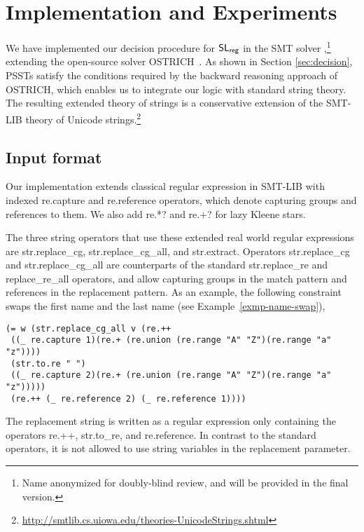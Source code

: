 
\section{Implementation and Experiments}
\label{sect:impl}

We have implemented our decision procedure for $\mathsf{SL}_{\sf reg}$ in the SMT
solver \ostrich,\footnote{Name anonymized for doubly-blind review,
and will be provided in the final version.} extending the
open-source solver OSTRICH~\cite{CHL+19}.
As shown in Section \ref{sec:decision},
PSSTs satisfy the conditions required by the backward reasoning
approach of OSTRICH, which enables us to integrate our logic with
standard string theory. The resulting extended theory of strings is a
conservative extension of the SMT-LIB theory of Unicode
strings.\footnote{\url{http://smtlib.cs.uiowa.edu/theories-UnicodeStrings.shtml}}

\subsection{Input format}

Our implementation extends classical regular expression in SMT-LIB
with indexed {\sf re.capture} and {\sf re.reference} operators, which
denote capturing groups and references to them. We also add {\sf re.*?}
and {\sf re.+?} for lazy Kleene stars.

The three string operators that use these extended real world regular
expressions are {\sf str.replace\_cg}, {\sf str.replace\_cg\_all}, and
{\sf str.extract}. Operators {\sf str.replace\_cg} and {\sf
  str.replace\_cg\_all} are counterparts of the standard {\sf
  str.replace\_re} and {\sf replace\_re\_all} operators, and allow
capturing groups in the match pattern and references in the
replacement pattern. As an example, the following constraint swaps the first name and the last name (see Example~\ref{exmp-name-swap}),
%
{\small
\begin{verbatim}
(= w (str.replace_cg_all v (re.++  
 ((_ re.capture 1)(re.+ (re.union (re.range "A" "Z")(re.range "a" "z"))))
 (str.to.re " ") 
 ((_ re.capture 2)(re.+ (re.union (re.range "A" "Z")(re.range "a" "z")))))
 (re.++ (_ re.reference 2) (_ re.reference 1))))
\end{verbatim}
}
%
The replacement string is written as a regular expression only
containing the operators {\sf re.++}, {\sf str.to\_re}, and {\sf re.reference}. In contrast to the standard operators, it is not allowed to use string variables in the 
replacement parameter.

